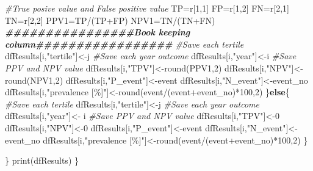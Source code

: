 \documentclass[
]{article}
\newenvironment{Shaded}{\begin{snugshade}}{\end{snugshade}}
\newcommand{\CommentTok}[1]{\textcolor[rgb]{0.56,0.35,0.01}{\textit{#1}}}
\newcommand{\ControlFlowTok}[1]{\textcolor[rgb]{0.13,0.29,0.53}{\textbf{#1}}}
\newcommand{\DecValTok}[1]{\textcolor[rgb]{0.00,0.00,0.81}{#1}}
\newcommand{\DocumentationTok}[1]{\textcolor[rgb]{0.56,0.35,0.01}{\textbf{\textit{#1}}}}
\newcommand{\FunctionTok}[1]{\textcolor[rgb]{0.00,0.00,0.00}{#1}}
\newcommand{\NormalTok}[1]{#1}
\newcommand{\OtherTok}[1]{\textcolor[rgb]{0.56,0.35,0.01}{#1}}
\newcommand{\SpecialCharTok}[1]{\textcolor[rgb]{0.00,0.00,0.00}{#1}}
\newcommand{\StringTok}[1]{\textcolor[rgb]{0.31,0.60,0.02}{#1}}
\begin{document}
\begin{Shaded}
\begin{Highlighting}[]
    \CommentTok{\#True posive value and False positive value}
\NormalTok{    TP}\OtherTok{=}\NormalTok{r[}\DecValTok{1}\NormalTok{,}\DecValTok{1}\NormalTok{]}
\NormalTok{    FP}\OtherTok{=}\NormalTok{r[}\DecValTok{1}\NormalTok{,}\DecValTok{2}\NormalTok{]}
\NormalTok{    FN}\OtherTok{=}\NormalTok{r[}\DecValTok{2}\NormalTok{,}\DecValTok{1}\NormalTok{]}
\NormalTok{    TN}\OtherTok{=}\NormalTok{r[}\DecValTok{2}\NormalTok{,}\DecValTok{2}\NormalTok{]}
\NormalTok{    PPV1}\OtherTok{=}\NormalTok{TP}\SpecialCharTok{/}\NormalTok{(TP}\SpecialCharTok{+}\NormalTok{FP)}
\NormalTok{    NPV1}\OtherTok{=}\NormalTok{TN}\SpecialCharTok{/}\NormalTok{(TN}\SpecialCharTok{+}\NormalTok{FN)}
    \DocumentationTok{\#\#\#\#\#\#\#\#\#\#\#\#\#\#\#\#Book keeping column\#\#\#\#\#\#\#\#\#\#\#\#\#\#\#\#\#}
    \CommentTok{\#Save each tertile}
\NormalTok{    dfResults[i,}\StringTok{"tertile"}\NormalTok{]}\OtherTok{\textless{}{-}}\NormalTok{j}
    \CommentTok{\#Save each year outcome}
\NormalTok{    dfResults[i,}\StringTok{"year"}\NormalTok{]}\OtherTok{\textless{}{-}}\NormalTok{i}
    \CommentTok{\#Save PPV and NPV value}
\NormalTok{    dfResults[i,}\StringTok{"TPV"}\NormalTok{]}\OtherTok{\textless{}{-}}\FunctionTok{round}\NormalTok{(PPV1,}\DecValTok{2}\NormalTok{)}
\NormalTok{    dfResults[i,}\StringTok{"NPV"}\NormalTok{]}\OtherTok{\textless{}{-}}\FunctionTok{round}\NormalTok{(NPV1,}\DecValTok{2}\NormalTok{)}
\NormalTok{    dfResults[i,}\StringTok{"P\_event"}\NormalTok{]}\OtherTok{\textless{}{-}}\NormalTok{event}
\NormalTok{    dfResults[i,}\StringTok{"N\_event"}\NormalTok{]}\OtherTok{\textless{}{-}}\NormalTok{event\_no  }
\NormalTok{    dfResults[i,}\StringTok{"prevalence [\%]"}\NormalTok{]}\OtherTok{\textless{}{-}}\FunctionTok{round}\NormalTok{(event}\SpecialCharTok{/}\NormalTok{(event}\SpecialCharTok{+}\NormalTok{event\_no)}\SpecialCharTok{*}\DecValTok{100}\NormalTok{,}\DecValTok{2}\NormalTok{)}
\NormalTok{    \}}\ControlFlowTok{else}\NormalTok{\{}
     \CommentTok{\#Save each tertile}
\NormalTok{    dfResults[i,}\StringTok{"tertile"}\NormalTok{]}\OtherTok{\textless{}{-}}\NormalTok{j}
    \CommentTok{\#Save each year outcome}
\NormalTok{    dfResults[i,}\StringTok{"year"}\NormalTok{]}\OtherTok{\textless{}{-}}\NormalTok{ i}
    \CommentTok{\#Save PPV and NPV value}
\NormalTok{    dfResults[i,}\StringTok{"TPV"}\NormalTok{]}\OtherTok{\textless{}{-}}\DecValTok{0}
\NormalTok{    dfResults[i,}\StringTok{"NPV"}\NormalTok{]}\OtherTok{\textless{}{-}}\DecValTok{0}
\NormalTok{    dfResults[i,}\StringTok{"P\_event"}\NormalTok{]}\OtherTok{\textless{}{-}}\NormalTok{event}
\NormalTok{    dfResults[i,}\StringTok{"N\_event"}\NormalTok{]}\OtherTok{\textless{}{-}}\NormalTok{event\_no }
\NormalTok{    dfResults[i,}\StringTok{"prevalence [\%]"}\NormalTok{]}\OtherTok{\textless{}{-}}\FunctionTok{round}\NormalTok{(event}\SpecialCharTok{/}\NormalTok{(event}\SpecialCharTok{+}\NormalTok{event\_no)}\SpecialCharTok{*}\DecValTok{100}\NormalTok{,}\DecValTok{2}\NormalTok{)}
\NormalTok{    \}}

\NormalTok{  \}}
  \FunctionTok{print}\NormalTok{(dfResults)}
\NormalTok{\}}
\end{Highlighting}
\end{Shaded}
\end{document}
